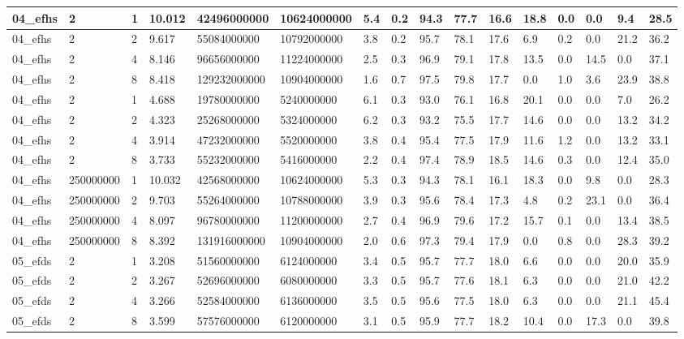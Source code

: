 \documentclass[12pt]{article}
\begin{document}
\begin{flushleft}
\begin{landscape}
\begin{tabular}{| l | l | l | l | l | l | l | l | l | l | l | l | l | l | l | l |}
		04\_efhs & 2 & 1 & 10.012 & 42496000000 & 10624000000 & 5.4 & 0.2 & 94.3 & 77.7 & 16.6 & 18.8 & 0.0 & 0.0 & 9.4 & 28.5 \\ \hline
		04\_efhs & 2 & 2 & 9.617 & 55084000000 & 10792000000 & 3.8 & 0.2 & 95.7 & 78.1 & 17.6 & 6.9 & 0.2 & 0.0 & 21.2 & 36.2 \\ \hline
		04\_efhs & 2 & 4 & 8.146 & 96656000000 & 11224000000 & 2.5 & 0.3 & 96.9 & 79.1 & 17.8 & 13.5 & 0.0 & 14.5 & 0.0 & 37.1 \\ \hline
		04\_efhs & 2 & 8 & 8.418 & 129232000000 & 10904000000 & 1.6 & 0.7 & 97.5 & 79.8 & 17.7 & 0.0 & 1.0 & 3.6 & 23.9 & 38.8 \\ \hline
		04\_efhs & 2 & 1 & 4.688 & 19780000000 & 5240000000 & 6.1 & 0.3 & 93.0 & 76.1 & 16.8 & 20.1 & 0.0 & 0.0 & 7.0 & 26.2 \\ \hline
		04\_efhs & 2 & 2 & 4.323 & 25268000000 & 5324000000 & 6.2 & 0.3 & 93.2 & 75.5 & 17.7 & 14.6 & 0.0 & 0.0 & 13.2 & 34.2 \\ \hline
		04\_efhs & 2 & 4 & 3.914 & 47232000000 & 5520000000 & 3.8 & 0.4 & 95.4 & 77.5 & 17.9 & 11.6 & 1.2 & 0.0 & 13.2 & 33.1 \\ \hline
		04\_efhs & 2 & 8 & 3.733 & 55232000000 & 5416000000 & 2.2 & 0.4 & 97.4 & 78.9 & 18.5 & 14.6 & 0.3 & 0.0 & 12.4 & 35.0 \\ \hline
		04\_efhs & 250000000 & 1 & 10.032 & 42568000000 & 10624000000 & 5.3 & 0.3 & 94.3 & 78.1 & 16.1 & 18.3 & 0.0 & 9.8 & 0.0 & 28.3 \\ \hline
		04\_efhs & 250000000 & 2 & 9.703 & 55264000000 & 10788000000 & 3.9 & 0.3 & 95.6 & 78.4 & 17.3 & 4.8 & 0.2 & 23.1 & 0.0 & 36.4 \\ \hline
		04\_efhs & 250000000 & 4 & 8.097 & 96780000000 & 11200000000 & 2.7 & 0.4 & 96.9 & 79.6 & 17.2 & 15.7 & 0.1 & 0.0 & 13.4 & 38.5 \\ \hline
		04\_efhs & 250000000 & 8 & 8.392 & 131916000000 & 10904000000 & 2.0 & 0.6 & 97.3 & 79.4 & 17.9 & 0.0 & 0.8 & 0.0 & 28.3 & 39.2 \\ \hline
		05\_efds & 2 & 1 & 3.208 & 51560000000 & 6124000000 & 3.4 & 0.5 & 95.7 & 77.7 & 18.0 & 6.6 & 0.0 & 0.0 & 20.0 & 35.9 \\ \hline
		05\_efds & 2 & 2 & 3.267 & 52696000000 & 6080000000 & 3.3 & 0.5 & 95.7 & 77.6 & 18.1 & 6.3 & 0.0 & 0.0 & 21.0 & 42.2 \\ \hline
		05\_efds & 2 & 4 & 3.266 & 52584000000 & 6136000000 & 3.5 & 0.5 & 95.6 & 77.5 & 18.0 & 6.3 & 0.0 & 0.0 & 21.1 & 45.4 \\ \hline
		05\_efds & 2 & 8 & 3.599 & 57576000000 & 6120000000 & 3.1 & 0.5 & 95.9 & 77.7 & 18.2 & 10.4 & 0.0 & 17.3 & 0.0 & 39.8 \\ \hline

\end{tabular}
\end{landscape}
\end{flushleft}
\end{document}
